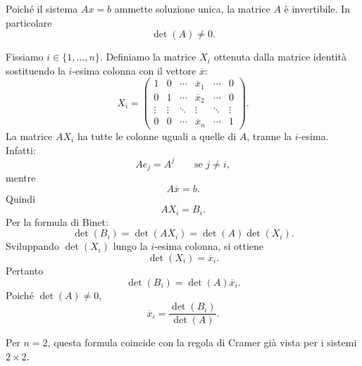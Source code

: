 \documentclass[a4paper]{article}
\begin{document}
\begin{snippetproof}{}
    Poiché il sistema \(Ax=b\) ammette soluzione unica, la matrice \(A\) è invertibile. In particolare
    \[
        \det(A)\neq 0.
    \]

    Fissiamo \(i\in\{1,\ldots,n\}\). Definiamo la matrice \(X_i\) ottenuta dalla matrice identità sostituendo la \(i\)-esima colonna con il vettore \(\overline{x}\):
    \[
        X_i=
        \begin{pmatrix}
            1 & 0 & \cdots & \overline{x}_1 & \cdots & 0\\
            0 & 1 & \cdots & \overline{x}_2 & \cdots & 0\\
            \vdots & \vdots & \ddots & \vdots & \ddots & \vdots\\
            0 & 0 & \cdots & \overline{x}_n & \cdots & 1
        \end{pmatrix}.
    \]
    La matrice \(AX_i\) ha tutte le colonne uguali a quelle di \(A\), tranne la \(i\)-esima. Infatti:
    \[
        Ae_j=A^j
        \qquad
        \text{se } j\neq i,
    \]
    mentre
    \[
        A\overline{x}=b.
    \]
    Quindi
    \[
        AX_i=B_i.
    \]
    Per la formula di Binet:
    \[
        \det(B_i)
        =
        \det(AX_i)
        =
        \det(A)\det(X_i).
    \]
    Sviluppando \(\det(X_i)\) lungo la \(i\)-esima colonna, si ottiene
    \[
        \det(X_i)=\overline{x}_i.
    \]
    Pertanto
    \[
        \det(B_i)=\det(A)\overline{x}_i.
    \]
    Poiché \(\det(A)\neq 0\),
    \[
        \overline{x}_i=\frac{\det(B_i)}{\det(A)}.
    \]
\end{snippetproof}

\begin{snippetremark}{}
    Per \(n=2\), questa formula coincide con la regola di Cramer già vista per i sistemi \(2\times 2\).
\end{snippetremark}
\end{document}

